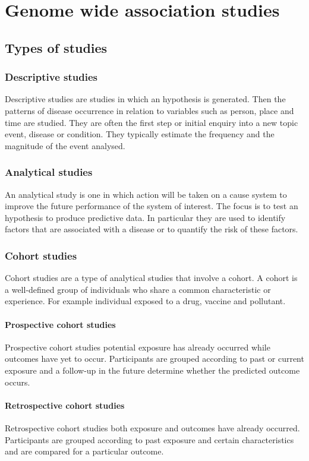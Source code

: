 \chapter{Genome wide association studies}

\section{Types of studies}

	\subsection{Descriptive studies}
	Descriptive studies are studies in which an hypothesis is generated.
	Then the patterns of disease occurrence in relation to variables such as person, place and time are studied.
	They are often the first step or initial enquiry into a new topic event, disease or condition.
	They typically estimate the frequency and the magnitude of the event analysed.

	\subsection{Analytical studies}
	An analytical study is one in which action will be taken on a cause system to improve the future performance of the system of interest.
	The focus is to test an hypothesis to produce predictive data.
	In particular they are used to identify factors that are associated with a disease or to quantify the risk of these factors.

	\subsection{Cohort studies}
	Cohort studies are a type of analytical studies that involve a cohort.
	A cohort is a well-defined group of individuals who share a common characteristic or experience.
	For example individual exposed to a drug, vaccine and pollutant.

		\subsubsection{Prospective cohort studies}
		Prospective cohort studies potential exposure has already occurred while outcomes have yet to occur.
		Participants are grouped according to past or current exposure and a follow-up in the future determine whether the predicted outcome occurs.

		\subsubsection{Retrospective cohort studies}
		Retrospective cohort studies both exposure and outcomes have already occurred.
		Participants are grouped according to past exposure and certain characteristics and are compared for a particular outcome.

